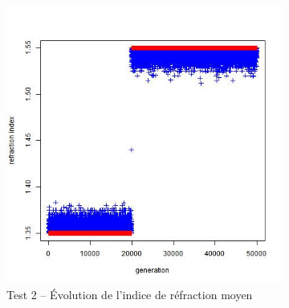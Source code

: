 \documentclass[a4paper,11pt]{article}
\begin{document}
\begin{figure}
\begin{subfigure}{.5\textwidth}
\includegraphics[width=1\linewidth]{1487424485848_evolution_average_refraction_index.jpeg}
\caption{Test 2 – Évolution de l'indice de réfraction moyen}
\label{fig:sub24}
\end{subfigure}
\caption{}
\label{fig:test}
\end{figure}

%


\end{document}
